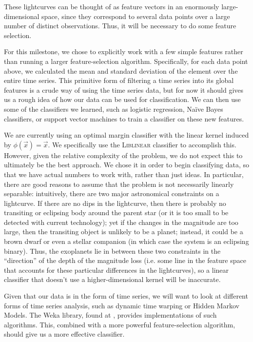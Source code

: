 \documentclass{amsart}
\begin{document}
These lightcurves can be thought of as feature vectors in an enormously large-dimensional space, since they correspond to several data points over a large number of distinct observations. Thus, it will be necessary to do some feature selection.

For this milestone, we chose to explicitly work with a few simple features rather than running a larger feature-selection algorithm. Specifically, for each data point above, we calculated the mean and standard deviation of the element over the entire time series. 
This primitive form of filtering a time series into its global features is a crude way of using the time series data, but for now it should gives us a rough idea of how our data can be used for classification. We can then use some of the classifiers we learned, such as logistic regression, Na\"ive Bayes classifiers, or support vector machines to train a classifier on these new features. 

We are currently using an optimal margin classifier with the linear kernel induced by $\phi(\vec x) = \vec x$. We specifically use the \textsc{Liblinear} classifier \cite{LibLinear} to accomplish this. However, given the relative complexity of the problem, we do not expect this to ultimately be the best approach. We chose it in order to begin classifying data, so that we have actual numbers to work with, rather than just ideas. In particular, there are good reasons to assume that the problem is not necessarily linearly separable: intuitively, there are two major astronomical constraints on a lightcurve. If there are no dips in the lightcurve, then there is probably no transiting or eclipsing body around the parent star (or it is too small to be detected with current technology); yet if the changes in the magnitude are too large, then the transiting object is unlikely to be a planet; instead, it could be a brown dwarf or even a stellar companion (in which case the system is an eclipsing binary). Thus, the exoplanets lie in between these two constraints in the ``direction'' of the depth of the magnitude loss (i.e. some line in the feature space that accounts for these particular differences in the lightcurves), so a linear classifier that doesn't use a higher-dimensional kernel will be inaccurate.

Given that our data is in the form of time series, we will want to look at different forms of time series analysis, such as dynamic time warping or Hidden Markov Models. The Weka library, found at \cite{Weka}, provides implementations of such algorithms. This, combined with a more powerful feature-selection algorithm, should give us a more effective classifier.
\end{document}
